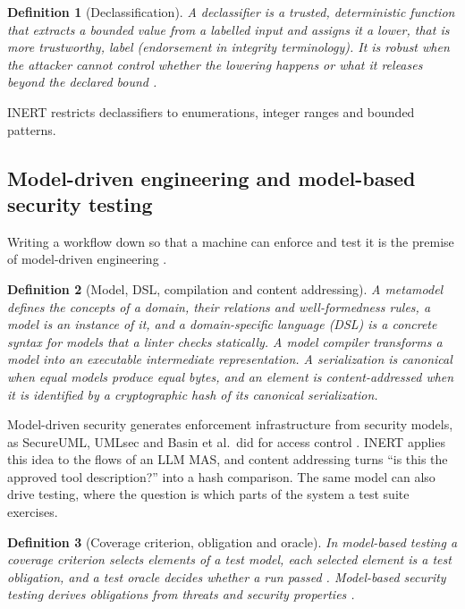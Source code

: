 \documentclass[pdflatex,sn-mathphys-num]{sn-jnl}
\theoremstyle{thmstyleone}%
\theoremstyle{thmstyletwo}%
\theoremstyle{thmstylethree}%
\newtheorem{definition}{Definition}%
\begin{document}
\begin{definition}[Declassification]\label{def:declass}
A \emph{declassifier} is a trusted, deterministic function that extracts a bounded value from a labelled input and assigns it a lower, that is more trustworthy, label (\emph{endorsement} in integrity terminology). It is robust when the attacker cannot control whether the lowering happens or what it releases beyond the declared bound \citep{zdancewic2001robust}.
\end{definition}

INERT restricts declassifiers to enumerations, integer ranges and bounded patterns.

\subsection{Model-driven engineering and model-based security testing}\label{sec:bg-mde}

Writing a workflow down so that a machine can enforce and test it is the premise of model-driven engineering \citep{schmidt2006mde}.

\begin{definition}[Model, DSL, compilation and content addressing]\label{def:model}
A \emph{metamodel} defines the concepts of a domain, their relations and well-formedness rules, a \emph{model} is an instance of it, and a \emph{domain-specific language} (DSL) is a concrete syntax for models that a \emph{linter} checks statically. A \emph{model compiler} transforms a model into an executable intermediate representation. A serialization is \emph{canonical} when equal models produce equal bytes, and an element is \emph{content-addressed} when it is identified by a cryptographic hash of its canonical serialization.
\end{definition}

Model-driven security generates enforcement infrastructure from security models, as SecureUML, UMLsec and Basin et al.\ did for access control \citep{lodderstedt2002secureuml,jurjens2002umlsec,basin2006mds}. INERT applies this idea to the flows of an LLM MAS, and content addressing turns ``is this the approved tool description?'' into a hash comparison. The same model can also drive testing, where the question is which parts of the system a test suite exercises.

\begin{definition}[Coverage criterion, obligation and oracle]\label{def:mbt}
In model-based testing a \emph{coverage criterion} selects elements of a test model, each selected element is a \emph{test obligation}, and a \emph{test oracle} decides whether a run passed \citep{utting2012taxonomy}. Model-based security testing derives obligations from threats and security properties \citep{felderer2016mbst}.
\end{definition}
\end{document}

